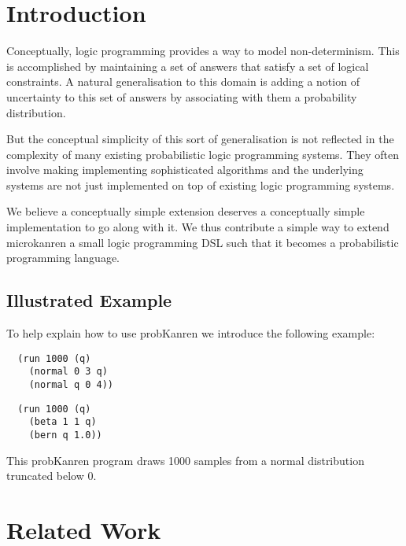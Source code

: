 \documentclass[
]{ceurart}
\begin{document}
\maketitle

\section{Introduction}

Conceptually, logic programming provides a way to model
non-determinism. This is accomplished by maintaining a set of answers
that satisfy a set of logical constraints. A natural generalisation
to this domain is adding a notion of uncertainty to this set of answers
by associating with them a probability distribution.

But the conceptual simplicity of this sort of generalisation is not reflected
in the complexity of many existing probabilistic logic programming systems.
They often involve making implementing sophisticated algorithms and the underlying
systems are not just implemented on top of existing logic programming systems.

We believe a conceptually simple extension deserves a conceptually
simple implementation to go along with it. We thus contribute a simple
way to extend microkanren a small logic programming DSL such that it
becomes a probabilistic programming language.

\subsection{Illustrated Example}

To help explain how to use probKanren we introduce the following example:


\begin{verbatim}
  (run 1000 (q)
    (normal 0 3 q)
    (normal q 0 4))
\end{verbatim}

\begin{verbatim}
  (run 1000 (q)
    (beta 1 1 q)
    (bern q 1.0))
\end{verbatim}

This probKanren program draws 1000 samples from a normal distribution truncated
below 0.

\section{Related Work}
\end{document}

